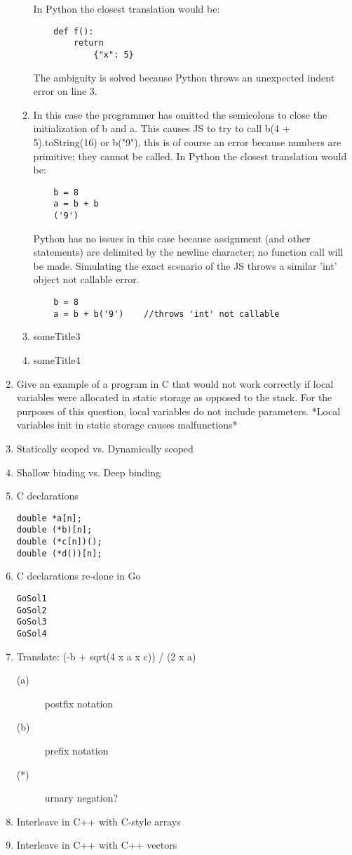 \documentclass{article}
\begin{document}
\begin{enumerate}
\begin{enumerate}
    In Python the closest translation would be:
    \begin{verbatim}
    def f():
        return
            {"x": 5}    
    \end{verbatim}
    The ambiguity is solved because Python throws an unexpected indent error on line 3.
    \item In this case the programmer has omitted the semicolons to close the initialization of b and a. This causes JS to try to call b(4 + 5).toString(16) or b("9"), this is of course an error because numbers are primitive; they cannot be called.
    In Python the closest translation would be:
    \begin{verbatim}
    b = 8
    a = b + b
    ('9')
    \end{verbatim}
    Python has no issues in this case because assignment (and other statements) are delimited by the newline character; no function call will be made. Simulating the exact scenario of the JS throws a similar 'int' object not callable error.
    \begin{verbatim}
    b = 8
    a = b + b('9')    //throws 'int' not callable
    \end{verbatim}
    \item someTitle3
    \item someTitle4
\end{enumerate}
\pagebreak
\item Give an example of a program in C that would not work correctly if local variables were allocated in static storage as opposed to the stack. For the purposes of this question, local variables do not include parameters. *Local variables init in static storage causes malfunctions*
\pagebreak
\item Statically scoped vs. Dynamically scoped
\pagebreak
\item Shallow binding vs. Deep binding
\pagebreak
\item C declarations
\begin{verbatim}
double *a[n];
double (*b)[n];
double (*c[n])();
double (*d())[n];
\end{verbatim}
\pagebreak
\item C declarations re-done in Go
\begin{verbatim}
GoSol1
GoSol2
GoSol3
GoSol4
\end{verbatim}
\pagebreak
\item Translate: (-b + sqrt(4 x a x c)) / (2 x a)
\begin{description}
    \item[(a)] postfix notation
    \item[(b)] prefix notation
    \item[(*)] urnary negation?
\end{description}
\pagebreak
\item Interleave in C++ with C-style arrays
\pagebreak
\item Interleave in C++ with C++ vectors
\pagebreak
\end{enumerate}
\end{document}
